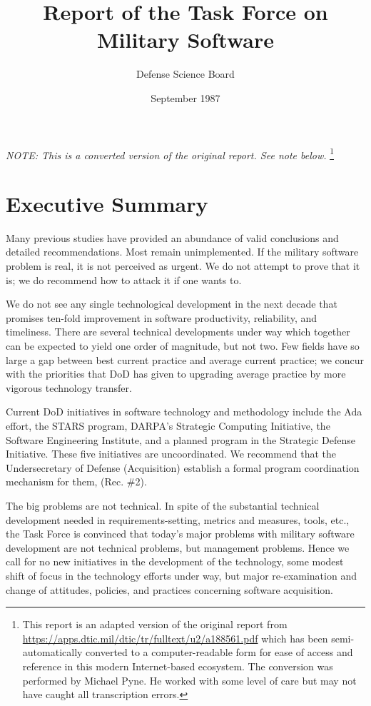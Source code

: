 \documentclass[11pt,final]{article}
\begin{document}
\tableofcontents
\thispagestyle{empty}

\newpage
{}

\title{Report of the Task Force on Military Software}
\author{Defense Science Board}
\date{September 1987}

\maketitle

\emph{NOTE: This is a converted version of the original report. See note below.}
\footnote{This report is an adapted version of the original report from
\url{https://apps.dtic.mil/dtic/tr/fulltext/u2/a188561.pdf} which has been
semi-automatically converted to a computer-readable form for ease of access and
reference in this modern Internet-based ecosystem. The conversion was performed
by Michael Pyne. He worked with some level of care but may not have caught all
transcription errors.}

\section{Executive Summary}

Many previous studies have provided an abundance of valid conclusions and
detailed recommendations. Most remain unimplemented. If the military software
problem is real, it is not perceived as urgent. We do not attempt to prove
that it is; we do recommend how to attack it if one wants to.

We do not see any single technological development in the next decade that
promises ten-fold improvement in software productivity, reliability, and
timeliness. There are several technical developments under way which together
can be expected to yield one order of magnitude, but not two. Few fields have
so large a gap between best current practice and average current practice; we
concur with the priorities that DoD has given to upgrading average practice by
more vigorous technology transfer.

Current DoD initiatives in software technology and methodology include the Ada
effort, the STARS program, DARPA’s Strategic Computing Initiative, the
Software Engineering Institute, and a planned program in the Strategic Defense
Initiative. These five initiatives are uncoordinated. We recommend that the
Undersecretary of Defense (Acquisition) establish a formal program
coordination mechanism for them, (Rec. \#2).

The big problems are not technical. In spite of the substantial technical
development needed in requirements-setting, metrics and measures, tools, etc.,
the Task Force is convinced that today’s major problems with military software
development are not technical problems, but management problems. Hence we call
for no new initiatives in the development of the technology, some modest shift
of focus in the technology efforts under way, but major re-examination and
change of attitudes, policies, and practices concerning software acquisition.
\end{document}
